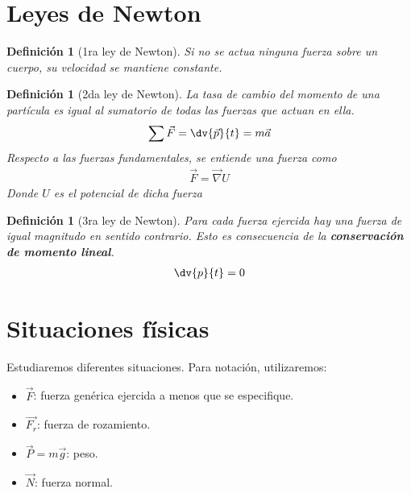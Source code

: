 \documentclass{article}
\newtheorem*{newton_first}{Definición}
\newtheorem*{newton_second}{Definición}
\newtheorem*{newton_third}{Definición}
\begin{document}
\section{Leyes de Newton}
\begin{newton_first}[1ra ley de Newton]
    Si no se actua ninguna fuerza sobre un cuerpo, su velocidad se mantiene constante.
\end{newton_first}
\begin{newton_second}[2da ley de Newton]
    La tasa de cambio del momento de una partícula es igual al sumatorio de todas las fuerzas que actuan en ella.
    \begin{equation}
        \begin{split}
            \sum \vec{F}= \dv{\vec{p}}{t}=m\vec{a}
        \end{split}
    \end{equation}
    Respecto a las fuerzas fundamentales, se entiende una fuerza como
    \begin{equation}
        \begin{split}
            \vec{F}= \vec{\nabla} U
        \end{split}
    \end{equation}
    Donde $U$ es el potencial de dicha fuerza
\end{newton_second}
\begin{newton_third}[3ra ley de Newton]
    Para cada fuerza ejercida hay una fuerza de igual magnitudo en sentido
    contrario. Esto es consecuencia de la \textbf{conservación de momento
    lineal}.
    \begin{equation}
        \begin{split}
            \dv{p}{t} = 0
        \end{split}
    \end{equation}
\end{newton_third}
\section{Situaciones físicas}
Estudiaremos diferentes situaciones. Para notación, utilizaremos:
\begin{itemize}
    \item $\vec{F}$: fuerza genérica ejercida a menos que se especifique.
    \item $\vec{F_{r}}$: fuerza de rozamiento.
    \item $\vec{P}=m \vec{g}$: peso.
    \item $\vec{N}$: fuerza normal.
\end{itemize}
\end{document}
